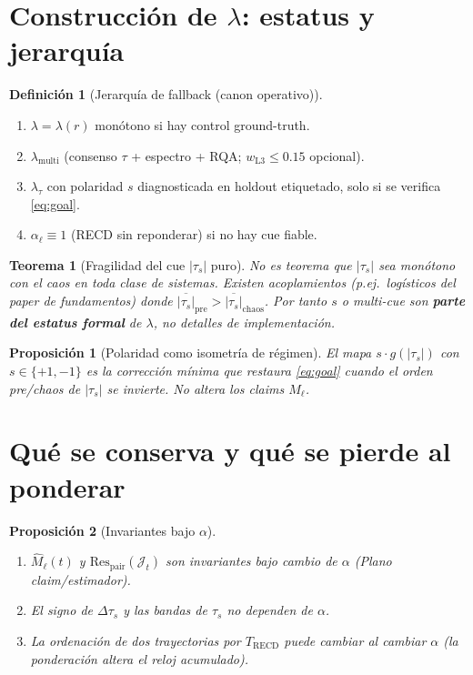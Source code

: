 \documentclass[11pt,a4paper]{article}
\theoremstyle{definition}
\newtheorem{definition}{Definici\'on}[section]
\theoremstyle{plain}
\newtheorem{proposition}{Proposici\'on}[section]
\newtheorem{theorem}{Teorema}[section]
\theoremstyle{remark}
\newcommand{\Res}{\mathrm{Res}}
\newcommand{\RECD}{\mathrm{RECD}}
\newcommand{\Jwin}{\mathcal{J}}
\begin{document}
\section{Construcción de $\lambda$: estatus y jerarqu\'ia}
\label{sec:lambda_build}

\begin{definition}[Jerarqu\'ia de fallback (canon operativo)]
\label{def:fallback}
\begin{enumerate}[label=(\arabic*)]
  \item $\lambda=\lambda(r)$ mon\'otono si hay control ground-truth.
  \item $\lambda_{\mathrm{multi}}$ (consenso $\tau$ + espectro + RQA;
  $w_{\mathrm{L3}}\le 0.15$ opcional).
  \item $\lambda_\tau$ con polaridad $s$ diagnosticada en holdout
  etiquetado, solo si se verifica \eqref{eq:goal}.
  \item $\alpha_\ell\equiv 1$ (RECD sin reponderar) si no hay cue
  fiable.
\end{enumerate}
\end{definition}

\begin{theorem}[Fragilidad del cue $|\tau_s|$ puro]
\label{thm:fragile}
No es teorema que $|\tau_s|$ sea mon\'otono con el caos en toda clase de
sistemas. Existen acoplamientos (p.ej.\ log\'isticos del paper de
fundamentos) donde $\overline{|\tau_s|}_{\mathrm{pre}}>\overline{|\tau_s|}_{\mathrm{chaos}}$.
Por tanto $s$ o multi-cue son \textbf{parte del estatus formal} de
$\lambda$, no detalles de implementaci\'on.
\end{theorem}

\begin{proposition}[Polaridad como isometr\'ia de r\'egimen]
\label{prop:polarity}
El mapa $s\cdot g(|\tau_s|)$ con $s\in\{+1,-1\}$ es la corrección
m\'inima que restaura \eqref{eq:goal} cuando el orden pre/chaos de
$|\tau_s|$ se invierte. No altera los claims $M_\ell$.
\end{proposition}

\section{Qu\'e se conserva y qu\'e se pierde al ponderar}
\label{sec:conserve}

\begin{proposition}[Invariantes bajo $\alpha$]
\label{prop:inv_alpha}
\begin{enumerate}[label=(\roman*)]
  \item $\widehat{M}_\ell(t)$ y $\Res_{\mathrm{pair}}(\Jwin_t)$ son
  invariantes bajo cambio de $\alpha$ (Plano claim/estimador).
  \item El signo de $\Delta\tau_s$ y las bandas de $\tau_s$ no dependen
  de $\alpha$.
  \item La ordenaci\'on de dos trayectorias por $T_{\RECD}$ \emph{puede}
  cambiar al cambiar $\alpha$ (la ponderación altera el reloj
  acumulado).
\end{enumerate}
\end{proposition}
\end{document}
